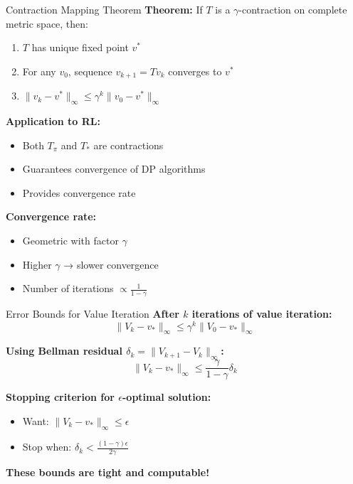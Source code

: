 \documentclass[aspectratio=169,10pt]{beamer}
\begin{document}
\begin{frame}{Contraction Mapping Theorem}
\textbf{Theorem:} If $T$ is a $\gamma$-contraction on complete metric space, then:
\begin{enumerate}
    \item $T$ has unique fixed point $v^*$
    \item For any $v_0$, sequence $v_{k+1} = Tv_k$ converges to $v^*$
    \item $\|v_k - v^*\|_\infty \leq \gamma^k \|v_0 - v^*\|_\infty$
\end{enumerate}

\textbf{Application to RL:}
\begin{itemize}
    \item Both $T_\pi$ and $T_*$ are contractions
    \item Guarantees convergence of DP algorithms
    \item Provides convergence rate
\end{itemize}

\textbf{Convergence rate:}
\begin{itemize}
    \item Geometric with factor $\gamma$
    \item Higher $\gamma$ → slower convergence
    \item Number of iterations $\propto \frac{1}{1-\gamma}$
\end{itemize}
\end{frame}

\begin{frame}{Error Bounds for Value Iteration}
\textbf{After $k$ iterations of value iteration:}
\begin{equation}
\|V_k - v_*\|_\infty \leq \gamma^k \|V_0 - v_*\|_\infty
\end{equation}

\textbf{Using Bellman residual $\delta_k = \|V_{k+1} - V_k\|_\infty$:}
\begin{equation}
\|V_k - v_*\|_\infty \leq \frac{\gamma}{1-\gamma} \delta_k
\end{equation}

\textbf{Stopping criterion for $\epsilon$-optimal solution:}
\begin{itemize}
    \item Want: $\|V_k - v_*\|_\infty \leq \epsilon$
    \item Stop when: $\delta_k < \frac{(1-\gamma)\epsilon}{2\gamma}$
\end{itemize}

\textbf{These bounds are tight and computable!}
\end{frame}
\end{document}
